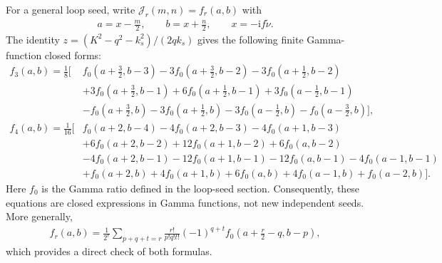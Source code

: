 \documentclass[a4paper,12pt]{article}
\def\ii{\mathrm{i}}
\def\tn{\tilde\nu}
\begin{document}
For a general loop seed, write $\mathcal{J}_r(m,n)=f_r(a,b)$ with
\begin{align}
    a=x-\frac{m}{2},\qquad b=x+\frac{n}{2},\qquad x=-\ii f\tn.
\end{align}
The identity $z=(K^2-q^2-k_s^2)/(2qk_s)$ gives the following finite Gamma-function
closed forms:
\begin{align}
    f_3(a,b)
    =\frac{1}{8}\Big[&f_0\left(a+\frac{3}{2},b-3\right)
    -3f_0\left(a+\frac{3}{2},b-2\right)
    -3f_0\left(a+\frac{1}{2},b-2\right) \nonumber \\
    &+3f_0\left(a+\frac{3}{2},b-1\right)
    +6f_0\left(a+\frac{1}{2},b-1\right)
    +3f_0\left(a-\frac{1}{2},b-1\right) \nonumber \\
    &-f_0\left(a+\frac{3}{2},b\right)
    -3f_0\left(a+\frac{1}{2},b\right)
    -3f_0\left(a-\frac{1}{2},b\right)
    -f_0\left(a-\frac{3}{2},b\right)\Big], \\
    f_4(a,b)
    =\frac{1}{16}\Big[&f_0(a+2,b-4)
    -4f_0(a+2,b-3)-4f_0(a+1,b-3) \nonumber \\
    &+6f_0(a+2,b-2)+12f_0(a+1,b-2)+6f_0(a,b-2) \nonumber \\
    &-4f_0(a+2,b-1)-12f_0(a+1,b-1)-12f_0(a,b-1)-4f_0(a-1,b-1) \nonumber \\
    &+f_0(a+2,b)+4f_0(a+1,b)+6f_0(a,b)+4f_0(a-1,b)+f_0(a-2,b)\Big].
\end{align}
Here $f_0$ is the Gamma ratio defined in the loop-seed section. Consequently, these equations are
closed expressions in Gamma functions, not new independent seeds. More generally,
\begin{align}
    f_r(a,b)=\frac{1}{2^r}
    \sum_{p+q+t=r}\frac{r!}{p!q!t!}(-1)^{q+t}
    f_0\left(a+\frac{r}{2}-q,b-p\right),
\end{align}
which provides a direct check of both formulas.

 

\end{document}
